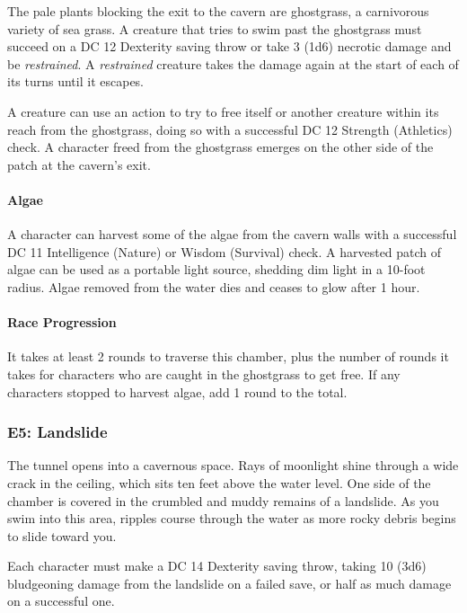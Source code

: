 \documentclass[a4paper, 11pt, bg=full, twocolumn, nooutline]{dndbook}
\begin{document}
The pale plants blocking the exit to the cavern are ghostgrass, a carnivorous variety of sea grass. A creature that tries to swim past the ghostgrass must succeed on a DC 12 Dexterity saving throw or take 3 (1d6) necrotic damage and be \textit{restrained}. A \textit{restrained} creature takes the damage again at the start of each of its turns until it escapes.

A creature can use an action to try to free itself or another creature within its reach from the ghostgrass, doing so with a successful DC 12 Strength (Athletics) check. A character freed from the ghostgrass emerges on the other side of the patch at the cavern's exit.

\paragraph{Algae}

A character can harvest some of the algae from the cavern walls with a successful DC 11 Intelligence (Nature) or Wisdom (Survival) check. A harvested patch of algae can be used as a portable light source, shedding dim light in a 10-foot radius. Algae removed from the water dies and ceases to glow after 1 hour.

\paragraph{Race Progression}

It takes at least 2 rounds to traverse this chamber, plus the number of rounds it takes for characters who are caught in the ghostgrass to get free. If any characters stopped to harvest algae, add 1 round to the total.

\subsubsection{E5: Landslide}

\begin{DndReadAloud}
The tunnel opens into a cavernous space. Rays of moonlight shine through a wide crack in the ceiling, which sits ten feet above the water level. One side of the chamber is covered in the crumbled and muddy remains of a landslide.
As you swim into this area, ripples course through the water as more rocky debris begins to slide toward you.
\end{DndReadAloud}

Each character must make a DC 14 Dexterity saving throw, taking 10 (3d6) bludgeoning damage from the landslide on a failed save, or half as much damage on a successful one.
\end{document}
